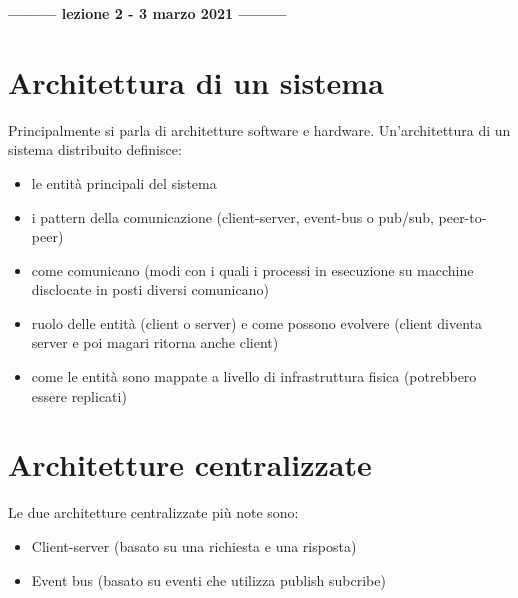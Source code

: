 \begin{center}
    \textbf{--------- lezione 2 - 3 marzo 2021 ---------}
\end{center}
\section{Architettura di un sistema}
Principalmente si parla di architetture software e hardware. Un'architettura di un sistema distribuito definisce:
\begin{itemize}
    \item le entità principali del sistema
    \item i pattern della comunicazione (client-server, event-bus o pub/sub, peer-to-peer)
    \item come comunicano (modi con i quali i processi in esecuzione su macchine disclocate in posti diversi comunicano)
    \item ruolo delle entità (client o server) e come possono evolvere (client diventa server e poi magari ritorna anche client)
    \item come le entità sono mappate a livello di infrastruttura fisica (potrebbero essere replicati)
\end{itemize}

\section{Architetture centralizzate}
Le due architetture centralizzate più note sono:
\begin{itemize}
    \item Client-server (basato su una richiesta e una risposta)
    \item Event bus (basato su eventi che utilizza publish subcribe)
\end{itemize}

